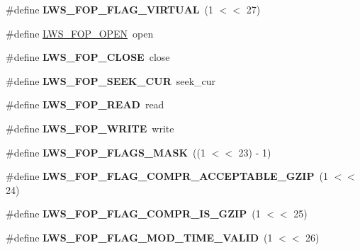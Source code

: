 \begin{DoxyCompactItemize}
\mbox{\label{group__fops_ga9705d2349b62f175fadc4a3f72e38c33}} 
\#define {\bfseries L\+W\+S\+\_\+\+F\+O\+P\+\_\+\+F\+L\+A\+G\+\_\+\+V\+I\+R\+T\+U\+AL}~(1 $<$$<$ 27)
\item 
\#define \hyperlink{group__fops_ga7972d4b546c7af37bb76d4c60f2ad553}{L\+W\+S\+\_\+\+F\+O\+P\+\_\+\+O\+P\+EN}~open
\item 
\mbox{\label{group__fops_ga993a0264dac738d32e40bfd802877596}} 
\#define {\bfseries L\+W\+S\+\_\+\+F\+O\+P\+\_\+\+C\+L\+O\+SE}~close
\item 
\mbox{\label{group__fops_ga372b5af81a2927c4a0d8f8ac04e22ea9}} 
\#define {\bfseries L\+W\+S\+\_\+\+F\+O\+P\+\_\+\+S\+E\+E\+K\+\_\+\+C\+UR}~seek\+\_\+cur
\item 
\mbox{\label{group__fops_gab0daaa4c50c0689f5ecddbc93b258052}} 
\#define {\bfseries L\+W\+S\+\_\+\+F\+O\+P\+\_\+\+R\+E\+AD}~read
\item 
\mbox{\label{group__fops_ga8ed9a52c15cb4efa6024a3632fb7a571}} 
\#define {\bfseries L\+W\+S\+\_\+\+F\+O\+P\+\_\+\+W\+R\+I\+TE}~write
\item 
\mbox{\label{group__fops_ga4515771d224d2dbaa6409e1958b81faf}} 
\#define {\bfseries L\+W\+S\+\_\+\+F\+O\+P\+\_\+\+F\+L\+A\+G\+S\+\_\+\+M\+A\+SK}~((1 $<$$<$ 23) -\/ 1)
\item 
\mbox{\label{group__fops_ga95a53aaaba125ce154e455d76d5b2c22}} 
\#define {\bfseries L\+W\+S\+\_\+\+F\+O\+P\+\_\+\+F\+L\+A\+G\+\_\+\+C\+O\+M\+P\+R\+\_\+\+A\+C\+C\+E\+P\+T\+A\+B\+L\+E\+\_\+\+G\+Z\+IP}~(1 $<$$<$ 24)
\item 
\mbox{\label{group__fops_ga5c896c010b90ab0fb6ff9ab96133e4b2}} 
\#define {\bfseries L\+W\+S\+\_\+\+F\+O\+P\+\_\+\+F\+L\+A\+G\+\_\+\+C\+O\+M\+P\+R\+\_\+\+I\+S\+\_\+\+G\+Z\+IP}~(1 $<$$<$ 25)
\item 
\mbox{\label{group__fops_ga2046444d8c9c559a5b4a2e78740e89fc}} 
\#define {\bfseries L\+W\+S\+\_\+\+F\+O\+P\+\_\+\+F\+L\+A\+G\+\_\+\+M\+O\+D\+\_\+\+T\+I\+M\+E\+\_\+\+V\+A\+L\+ID}~(1 $<$$<$ 26)
\item 
\mbox{\label{group__fops_ga9705d2349b62f175fadc4a3f72e38c33}} 
$$
\end{DoxyCompactItemize}
